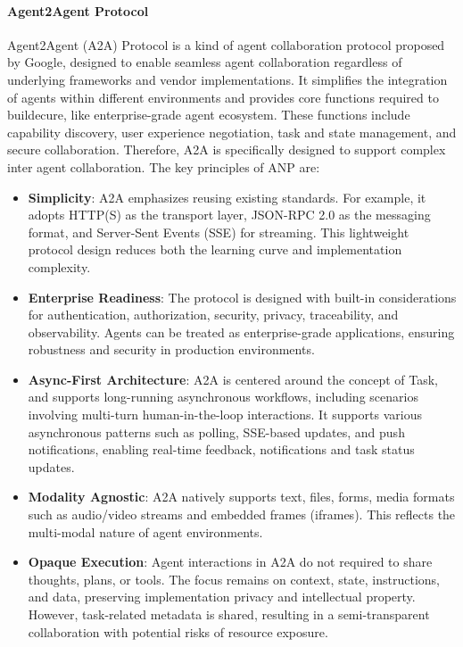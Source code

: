 \documentclass[10pt,preprint]{article}
\begin{document}
\paragraph{Agent2Agent Protocol~\citep{a2a2025}}
Agent2Agent (A2A) Protocol is a kind of agent collaboration protocol proposed by Google, designed to enable seamless agent collaboration regardless of underlying frameworks and vendor implementations. It simplifies the integration of agents within different environments and provides core functions required to buildecure, like enterprise-grade agent ecosystem. These functions include capability discovery, user experience negotiation, task and state management, and secure collaboration. Therefore, A2A is specifically designed to support complex inter agent collaboration. The key principles of ANP are:
\begin{itemize}
    \item \textbf{Simplicity}: A2A emphasizes reusing existing standards. For example, it adopts HTTP(S) as the transport layer, JSON-RPC 2.0 as the messaging format, and Server-Sent Events (SSE) for streaming. This lightweight protocol design reduces both the learning curve and implementation complexity.
    \item \textbf{Enterprise Readiness}: The protocol is designed with built-in considerations for authentication, authorization, security, privacy, traceability, and observability. Agents can be treated as enterprise-grade applications, ensuring robustness and security in production environments. 
    \item \textbf{Async-First Architecture}: A2A is centered around the concept of Task, and supports long-running asynchronous workflows, including scenarios involving multi-turn human-in-the-loop interactions. It supports various asynchronous patterns such as polling, SSE-based updates, and push notifications, enabling real-time feedback, notifications and task status updates.
    \item \textbf{Modality Agnostic}: A2A natively supports text, files, forms, media formats such as audio/video streams and embedded frames (iframes). This reflects the multi-modal nature of agent environments.
    \item \textbf{Opaque Execution}: Agent interactions in A2A do not required to share thoughts, plans, or tools. The focus remains on context, state, instructions, and data, preserving implementation privacy and intellectual property. However, task-related metadata is shared, resulting in a semi-transparent collaboration with potential risks of resource exposure.
\end{itemize}
\end{document}
